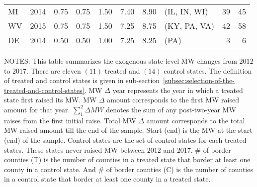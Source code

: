 \begin{table}[H]
{\begin{tabular}{lrrrrrrlrr}
            MI             & 2014             & 0.75               & 0.75                    & 1.50                     & 7.40     & 8.90   & (IL, IN, WI)   & 39                        & 45                        \\
            WV             & 2015             & 0.75               & 0.75                    & 1.50                     & 7.25     & 8.75   & (KY, PA, VA)   & 42                        & 58                        \\
            DE             & 2014             & 0.50               & 0.50                    & 1.00                     & 7.25     & 8.25   & (PA)           & 3                         & 6                         \\ \bottomrule\bottomrule
        \end{tabular}
    }
    \begin{minipage}{17.5cm}
        \vspace{0.01in}
        \tiny NOTES: This table summarizes the exogenous state-level MW changes from $2012$ to $2017$. There are eleven $(11)$ treated and $(14)$ control states. The definition of treated and control states is given in sub-section~\ref{subsec:selection-of-the-treated-and-control-states}. MW $\Delta$ year represents the year in which a treated state first raised its MW. MW $\Delta$ amount corresponds to the first MW raised amount for that year. $\sum_{1}^{2}\Delta MW$ denotes the sum of any post-two-year MW raises from the first initial raise. Total MW $\Delta$ amount corresponds to the total MW raised amount till the end of the sample. Start (end) is the MW at the start (end) of the sample. Control states are the set of control states for each treated states. These states never raised MW between $2012$ and $2017$. \# of border counties (T) is the number of counties in a treated state that border at least one county in a control state. And \# of border counties (C) is the number of counties in a control state that border at least one county in a treated state.
    \end{minipage}
\end{table}
